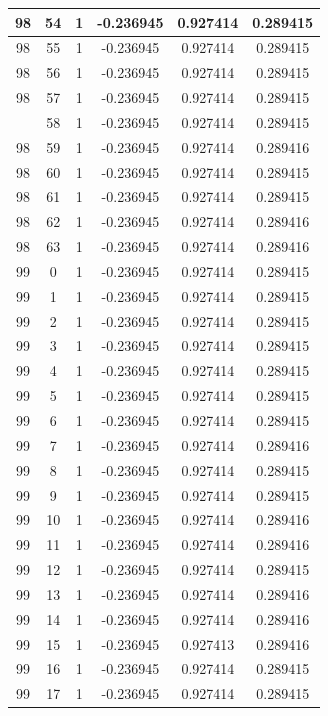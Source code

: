 \documentclass[12pt,a4paper]{article}
\numberwithin{equation}{section}
\numberwithin{figure}{section}
\numberwithin{table}{section}
\begin{document}
\begin{longtable}{|c|c|c|c|c|c|}
98 & 54 & 1 & -0.236945 & 0.927414 & 0.289415 \\ \hline
98 & 55 & 1 & -0.236945 & 0.927414 & 0.289415 \\ \hline
98 & 56 & 1 & -0.236945 & 0.927414 & 0.289415 \\ \hline
98 & 57 & 1 & -0.236945 & 0.927414 & 0.289415 \\ \hline
\pagebreak
98 & 58 & 1 & -0.236945 & 0.927414 & 0.289415 \\ \hline
98 & 59 & 1 & -0.236945 & 0.927414 & 0.289416 \\ \hline
98 & 60 & 1 & -0.236945 & 0.927414 & 0.289415 \\ \hline
98 & 61 & 1 & -0.236945 & 0.927414 & 0.289415 \\ \hline
98 & 62 & 1 & -0.236945 & 0.927414 & 0.289416 \\ \hline
98 & 63 & 1 & -0.236945 & 0.927414 & 0.289416 \\ \hline
99 & 0 & 1 & -0.236945 & 0.927414 & 0.289415 \\ \hline
99 & 1 & 1 & -0.236945 & 0.927414 & 0.289415 \\ \hline
99 & 2 & 1 & -0.236945 & 0.927414 & 0.289415 \\ \hline
99 & 3 & 1 & -0.236945 & 0.927414 & 0.289415 \\ \hline
99 & 4 & 1 & -0.236945 & 0.927414 & 0.289415 \\ \hline
99 & 5 & 1 & -0.236945 & 0.927414 & 0.289415 \\ \hline
99 & 6 & 1 & -0.236945 & 0.927414 & 0.289415 \\ \hline
99 & 7 & 1 & -0.236945 & 0.927414 & 0.289416 \\ \hline
99 & 8 & 1 & -0.236945 & 0.927414 & 0.289415 \\ \hline
99 & 9 & 1 & -0.236945 & 0.927414 & 0.289415 \\ \hline
99 & 10 & 1 & -0.236945 & 0.927414 & 0.289416 \\ \hline
99 & 11 & 1 & -0.236945 & 0.927414 & 0.289416 \\ \hline
99 & 12 & 1 & -0.236945 & 0.927414 & 0.289415 \\ \hline
99 & 13 & 1 & -0.236945 & 0.927414 & 0.289416 \\ \hline
99 & 14 & 1 & -0.236945 & 0.927414 & 0.289416 \\ \hline
99 & 15 & 1 & -0.236945 & 0.927413 & 0.289416 \\ \hline
99 & 16 & 1 & -0.236945 & 0.927414 & 0.289415 \\ \hline
99 & 17 & 1 & -0.236945 & 0.927414 & 0.289415 \\ \hline

\end{longtable}
\end{document}
